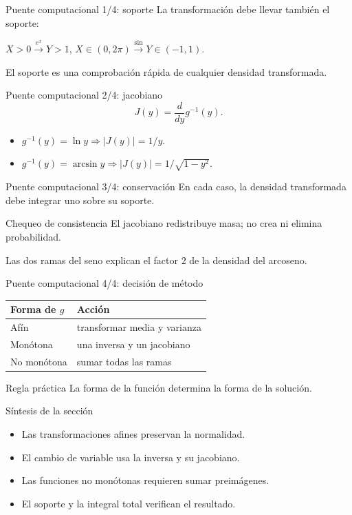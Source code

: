 \documentclass[10pt,aspectratio=169]{beamer}
\begin{document}
\begin{frame}{Puente computacional 1/4: soporte}
  \footnotesize
  La transformación debe llevar también el soporte:
  \begin{center}
    $X>0\xrightarrow{e^x}Y>1$,\qquad
    $X\in(0,2\pi)\xrightarrow{\sin}Y\in(-1,1)$.
  \end{center}
  El soporte es una comprobación rápida de cualquier densidad transformada.
\end{frame}

\begin{frame}{Puente computacional 2/4: jacobiano}
  \footnotesize
  \[
    J(y)=\frac{d}{dy}g^{-1}(y).
  \]
  \begin{itemize}\itemsep=0.12cm
    \item $g^{-1}(y)=\ln y\Rightarrow |J(y)|=1/y$.
    \item $g^{-1}(y)=\arcsin y\Rightarrow |J(y)|=1/\sqrt{1-y^2}$.
  \end{itemize}
\end{frame}

\begin{frame}{Puente computacional 3/4: conservación}
  \footnotesize
  En cada caso, la densidad transformada debe integrar uno sobre su soporte.
  \begin{block}{Chequeo de consistencia}
    El jacobiano redistribuye masa; no crea ni elimina probabilidad.
  \end{block}
  Las dos ramas del seno explican el factor $2$ de la densidad del arcoseno.
\end{frame}

\begin{frame}{Puente computacional 4/4: decisión de método}
  \footnotesize
  \begin{tabular}{ll}
    \hline
    Forma de $g$ & Acción \\
    \hline
    Afín & transformar media y varianza \\
    Monótona & una inversa y un jacobiano \\
    No monótona & sumar todas las ramas \\
    \hline
  \end{tabular}
  \begin{alertblock}{Regla práctica}
    La forma de la función determina la forma de la solución.
  \end{alertblock}
\end{frame}

\begin{frame}{Síntesis de la sección}
  \footnotesize
  \begin{itemize}\itemsep=0.12cm
    \item Las transformaciones afines preservan la normalidad.
    \item El cambio de variable usa la inversa y su jacobiano.
    \item Las funciones no monótonas requieren sumar preimágenes.
    \item El soporte y la integral total verifican el resultado.
  \end{itemize}
\end{frame}
\end{document}
